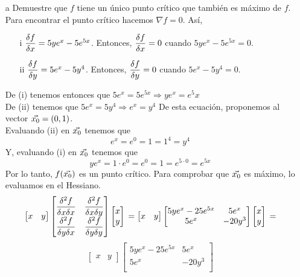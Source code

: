 \documentclass[a4paper,12pt]{article}
\begin{document}
\begin{itemize}
	\item[a] Demuestre que  $f$ tiene un único punto crítico que también es máximo de $f$.
	Para encontrar el punto crítico hacemos $\nabla f = 0$. Así, 
	\begin{itemize}
		\item[i] $\dfrac{\delta f}{\delta x} = 5ye^x-5e^{5x}$. Entonces, $\dfrac{\delta f}{\delta x} = 0$ cuando $5ye^x-5e^{5x} = 0$.
		\item[ii]$\dfrac{\delta f}{\delta y} = 5e^x-5y^4$. Entonces, $\dfrac{\delta f}{\delta y} = 0$ cuando $5e^x-5y^4 = 0$.
	\end{itemize}
	De (i) tenemos entonces que $5e^x = 5e^{5x} \Rightarrow ye^x = e^5x$\\
	De (ii) tenemos que $5e^x = 5y^4 \Rightarrow e^x = y^4$ De esta ecuación, proponemos al vector $\vec{x_0} = (0,1)$.\\
	Evaluando (ii) en $\vec{x_0}$ tenemos que 
	$$ e^x = e^0 = 1 = 1^4 = y^4$$
	Y, evaluando (i) en $\vec{x_0}$ tenemos que 
	$$ye^x = 1\cdot e^0 = e^0 = 1 = e^{5\cdot 0} = e^{5x}$$
	Por lo tanto, $f(\vec{x_0})$ es un punto crítico.
	Para comprobar que $\vec{x_0}$ es máximo, lo evaluamos en el Hessiano.
	\[
	\begin{bmatrix}
	x & y
	\end{bmatrix}
	\begin{bmatrix}
	    \dfrac{\delta ^2 f}{\delta x \delta x} & \dfrac{\delta ^2 f}{\delta x \delta y}\\
		\dfrac{\delta ^2 f}{\delta y \delta x} & \dfrac{\delta ^2 f}{\delta y \delta y}\\
	\end{bmatrix}
	\begin{bmatrix}
	x \\ y
	\end{bmatrix}\\
	= 
	\begin{bmatrix}
	x & y
	\end{bmatrix}
	\begin{bmatrix}
	    5ye^x - 25e^{5x} & 5e^x\\
		5e^x & -20y^3\\
	\end{bmatrix} 
	\begin{bmatrix}
	x \\ y
	\end{bmatrix}\\
	=
	\]
	\[
	\begin{bmatrix}
	x & y
	\end{bmatrix}
	\begin{bmatrix}
	    5ye^x - 25e^{5x} & 5e^x\\
		5e^x & -20y^3\\

\end{bmatrix}\]
\end{itemize}
\end{document}
